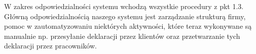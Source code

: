 

W zakres odpowiedzialności systemu wchodzą wszystkie procedury z pkt 1.3.
Główną odpowiedzialnością naszego systemu jest zarządzanie strukturą firmy, pomoc 
w zautomatyzowaniu niektórych aktywności, które teraz wykonywane są manualnie np. przesyłanie deklaracji przez klientów oraz przetwarzanie tych deklaracji przez pracowników.